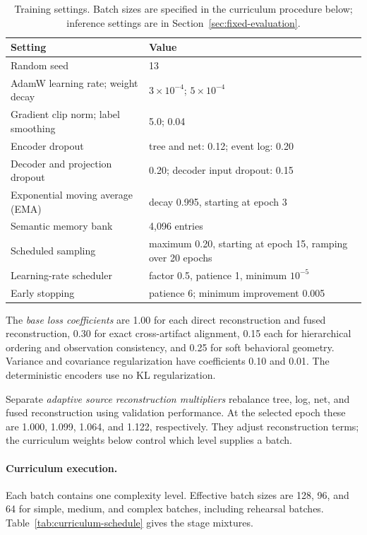 \documentclass[mathematics,article,submit,moreauthors]{Definitions/mdpi}
\begin{document}
\begin{table}[!htb]
\centering
\caption{Training settings. Batch sizes are specified in the curriculum procedure below; inference settings are in Section~\ref{sec:fixed-evaluation}.}
\label{tab:hyperparameters}
\begin{tabularx}{\textwidth}{@{}Q{0.38\textwidth}Y@{}}
\toprule
Setting & Value \\
\midrule
Random seed & 13 \\
AdamW learning rate; weight decay & $3\times10^{-4}$; $5\times10^{-4}$ \\
Gradient clip norm; label smoothing & 5.0; 0.04 \\
Encoder dropout & tree and net: 0.12; event log: 0.20 \\
Decoder and projection dropout & 0.20; decoder input dropout: 0.15 \\
Exponential moving average (EMA) & decay 0.995, starting at epoch 3 \\
Semantic memory bank & 4,096 entries \\
Scheduled sampling & maximum 0.20, starting at epoch 15, ramping over 20 epochs \\
Learning-rate scheduler & factor 0.5, patience 1, minimum $10^{-5}$ \\
Early stopping & patience 6; minimum improvement 0.005 \\
\bottomrule
\end{tabularx}
\end{table}

The \emph{base loss coefficients} are 1.00 for each direct reconstruction and fused reconstruction, 0.30 for exact cross-artifact alignment, 0.15 each for hierarchical ordering and observation consistency, and 0.25 for soft behavioral geometry. Variance and covariance regularization have coefficients 0.10 and 0.01. The deterministic encoders use no KL regularization.

Separate \emph{adaptive source reconstruction multipliers} rebalance tree, log, net, and fused reconstruction using validation performance. At the selected epoch these are 1.000, 1.099, 1.064, and 1.122, respectively. They adjust reconstruction terms; the curriculum weights below control which level supplies a batch.

\paragraph{Curriculum execution.}
Each batch contains one complexity level. Effective batch sizes are 128, 96, and 64 for simple, medium, and complex batches, including rehearsal batches. Table~\ref{tab:curriculum-schedule} gives the stage mixtures.
\end{document}
